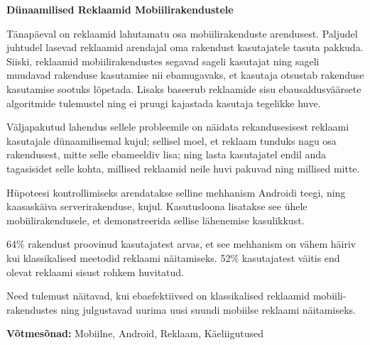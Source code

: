 \begin{abstracts}

\textbf{D\"{u}naamilised Reklaamid Mobiilirakendustele}

T\"{a}nap\"{a}eval on reklaamid lahutamatu osa mobiilirakenduste arendusest. Paljudel juhtudel lasevad reklaamid arendajal oma rakendust kasutajatele tasuta pakkuda. Siiski, reklaamid mobiilirakendustes segavad sageli kasutajat ning sageli muudavad rakenduse kasutamise nii ebamugavaks, et kasutaja otsustab rakenduse kasutamise sootuks l\~{o}petada. Lisaks baseerub reklaamide sisu ebausaldusv\"{a}\"{a}rsete algoritmide tulemustel ning ei pruugi kajastada kasutaja tegelikke huve.

V\"{a}ljapakutud lahendus sellele probleemile on n\"{a}idata rekandusesisest reklaami kasutajale d\"{u}naamilisemal kujul; sellisel moel, et reklaam tunduks nagu osa rakendusest, mitte selle ebameeldiv lisa; ning lasta kasutajatel endil anda tagasisidet selle kohta, millised reklaamid neile huvi pakuvad ning millised mitte.

H\"{u}poteesi kontrollimiseks arendatakse selline mehhanism Androidi teegi, ning kaasask\"{a}iva serverirakenduse, kujul. Kasutusloona lisatakse see \"{u}hele mobiilirakendusele, et demonstreerida sellise l\"{a}henemise kasulikkust.

64\% rakendust proovinud kasutajatest arvas, et see mehhanism on v\"{a}hem h\"{a}iriv kui klassikalised meetodid reklaami n\"{a}itamiseks. 52\% kasutajatest v\"{a}itis end olevat reklaami sisust rohkem huvitatud.

Need tulemust n\"{a}itavad, kui ebaefektiivsed on klassikalised reklaamid mobiili-rakendustes ning julgustavad uurima uusi suundi mobiilse reklaami n\"{a}itamiseks.

\bigskip

\textbf{V\~{o}tmes\~{o}nad:} Mobiilne, Android, Reklaam, K\"{a}eliigutused

\end{abstracts}
